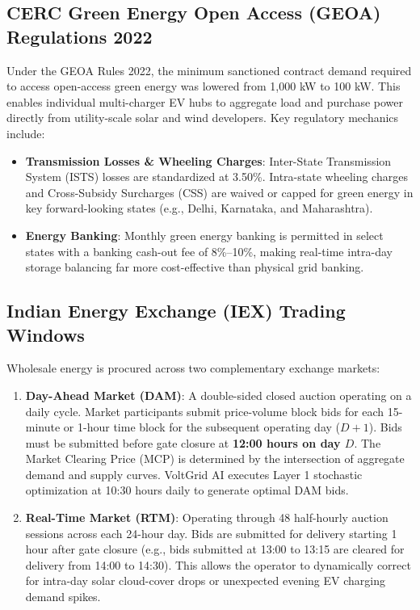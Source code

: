 \documentclass[10.5pt,a4paper]{article}
\begin{document}
\subsection{CERC Green Energy Open Access (GEOA) Regulations 2022}
Under the GEOA Rules 2022, the minimum sanctioned contract demand required to access open-access green energy was lowered from 1,000 kW to 100 kW. This enables individual multi-charger EV hubs to aggregate load and purchase power directly from utility-scale solar and wind developers. Key regulatory mechanics include:
\begin{itemize}[noitemsep]
    \item \textbf{Transmission Losses \& Wheeling Charges}: Inter-State Transmission System (ISTS) losses are standardized at 3.50\%. Intra-state wheeling charges and Cross-Subsidy Surcharges (CSS) are waived or capped for green energy in key forward-looking states (e.g., Delhi, Karnataka, and Maharashtra).
    \item \textbf{Energy Banking}: Monthly green energy banking is permitted in select states with a banking cash-out fee of 8\%--10\%, making real-time intra-day storage balancing far more cost-effective than physical grid banking.
\end{itemize}

\subsection{Indian Energy Exchange (IEX) Trading Windows}
Wholesale energy is procured across two complementary exchange markets:
\begin{enumerate}
    \item \textbf{Day-Ahead Market (DAM)}: A double-sided closed auction operating on a daily cycle. Market participants submit price-volume block bids for each 15-minute or 1-hour time block for the subsequent operating day ($D+1$). Bids must be submitted before gate closure at \textbf{12:00 hours on day $D$}. The Market Clearing Price (MCP) is determined by the intersection of aggregate demand and supply curves. VoltGrid AI executes Layer 1 stochastic optimization at 10:30 hours daily to generate optimal DAM bids.
    \item \textbf{Real-Time Market (RTM)}: Operating through 48 half-hourly auction sessions across each 24-hour day. Bids are submitted for delivery starting 1 hour after gate closure (e.g., bids submitted at 13:00 to 13:15 are cleared for delivery from 14:00 to 14:30). This allows the operator to dynamically correct for intra-day solar cloud-cover drops or unexpected evening EV charging demand spikes.
\end{enumerate}
\end{document}
